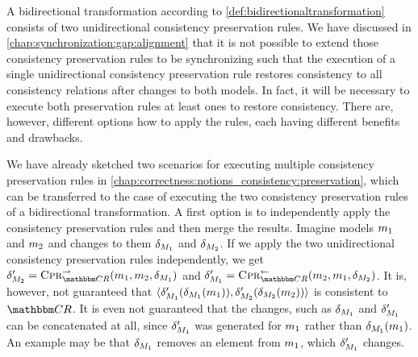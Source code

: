 A bidirectional transformation according to \autoref{def:bidirectionaltransformation} consists of two unidirectional consistency preservation rules.
We have discussed in \autoref{chap:synchronization:gap:alignment} that it is not possible to extend those consistency preservation rules to be synchronizing such that the execution of a single unidirectional consistency preservation rule restores consistency to all consistency relations after changes to both models.
In fact, it will be necessary to execute both preservation rules at least ones to restore consistency.
There are, however, different options how to apply the rules, each having different benefits and drawbacks.

We have already sketched two scenarios for executing multiple consistency preservation rules in \autoref{chap:correctness:notions_consistency:preservation}, which can be transferred to the case of executing the two consistency preservation rules of a bidirectional transformation.
A first option is to independently apply the consistency preservation rules and then merge the results.
Imagine models $\model{m}{1}$ and $\model{m}{2}$ and changes to them $\change{\metamodel{M}{1}}$ and $\change{\metamodel{M}{2}}$.
If we apply the two unidirectional consistency preservation rules independently, we get $\change{\metamodel{M}{2}}' = \consistencypreservationrule{\consistencyrelationset{CR}}^{\rightarrow}(\model{m}{1},\model{m}{2}, \change{\metamodel{M}{1}})$ and $\change{\metamodel{M}{1}}' = \consistencypreservationrule{\consistencyrelationset{CR}{}}^{\leftarrow}(\model{m}{2}, \model{m}{1}, \change{\metamodel{M}{2}})$.
It is, however, not guaranteed that $\tupled{\change{\metamodel{M}{1}}'(\change{\metamodel{M}{1}}(\model{m}{1})), \change{\metamodel{M}{2}}'(\change{\metamodel{M}{2}}(\model{m}{2}))}$ is consistent to $\consistencyrelationset{CR}$.
It is even not guaranteed that the changes, such as $\change{\metamodel{M}{1}}$ and $\change{\metamodel{M}{1}}'$ can be concatenated at all, since $\change{\metamodel{M}{1}}'$ was generated for $\model{m}{1}$ rather than $\change{\metamodel{M}{1}}(\model{m}{1})$.
An example may be that $\change{\metamodel{M}{1}}$ removes an element from $\model{m}{1}$, which $\change{\metamodel{M}{1}}'$ changes.
